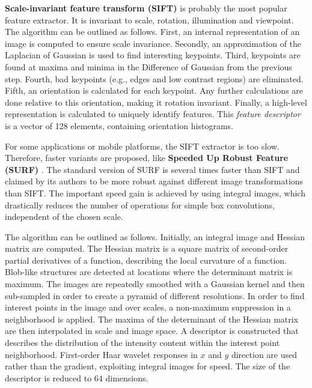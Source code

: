 \textbf{Scale-invariant feature transform (SIFT)} \cite{lowe1999object} is probably the most popular feature extractor.
It is invariant to scale, rotation, illumination and viewpoint.
The algorithm can be outlined as follows.
First, an internal representation of an image is computed to ensure scale invariance.
Secondly, an approximation of the Laplacian of Gaussian is used to find interesting keypoints.
Third, keypoints are found at maxima and minima in the Difference of Gaussian from the previous step.
Fourth, bad keypoints (e.g., edges and low contrast regions) are eliminated.
Fifth, an orientation is calculated for each keypoint.
Any further calculations are done relative to this orientation, making it rotation invariant.
Finally, a high-level representation is calculated to uniquely identify features.
This \textit{feature descriptor} is a vector of 128 elements, containing orientation histograms.

For some applications or mobile platforms, the SIFT extractor is too slow.
Therefore, faster variants are proposed, like \textbf{Speeded Up Robust Feature (SURF)} \cite{Bay2008cviu}.
The standard version of SURF is several times faster than SIFT and claimed by its authors to be more robust against different image transformations than SIFT.
The important speed gain is achieved by using integral images, which drastically reduces the number of operations for simple box convolutions, independent of the chosen scale.

The algorithm can be outlined as follows.
Initially, an integral image and Hessian matrix \cite{van1994complex} are computed.
The Hessian matrix is a square matrix of second-order partial derivatives of a function, describing the local curvature of a function.
Blob-like structures are detected at locations where the determinant matrix is maximum.
The images are repeatedly smoothed with a Gaussian kernel and then sub-sampled in order to create a pyramid of different resolutions.
In order to find interest points in the image and over scales, a non-maximum suppression in a 
neighborhood is applied. 
The maxima of the determinant of the Hessian matrix are then interpolated in scale and image space.
A descriptor is constructed that describes the distribution of the intensity content within the interest point neighborhood.
First-order Haar wavelet \cite{stollnitz1995wavelets} responses in $x$ and $y$ direction are used rather than the gradient, exploiting integral images for speed. The size of the descriptor is reduced to $64$ dimensions.


